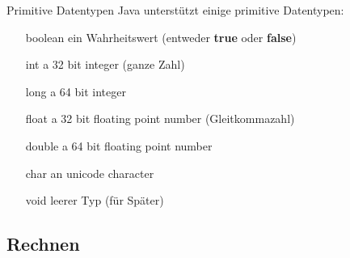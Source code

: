 \begin{frame}{Primitive Datentypen}
	Java unterstützt einige primitive Datentypen:
	\begin{itemize}
		\item[boolean] ein Wahrheitswert (entweder \textbf{true} oder \textbf{false})
		\item[int] a 32 bit integer (ganze Zahl)
		\item[long] a 64 bit integer
		\item[float] a 32 bit floating point number (Gleitkommazahl)
		\item[double] a 64 bit floating point number
		\item[char] an unicode character
		\item[void] leerer Typ (für Später)
	\end{itemize}
\end{frame}

\subsection{Rechnen}


